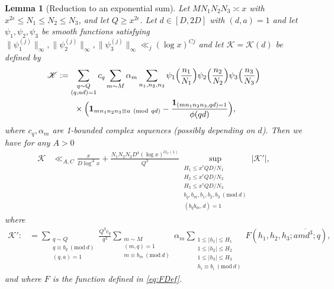 \documentclass[10pt]{amsart}
\theoremstyle{plain}
\newtheorem{lmm}[thrm]{Lemma}
\numberwithin{equation}{section}
\newcommand{\Mod}[1]{\ (\mathrm{mod}\ #1)}
\begin{document}
\begin{lmm}[Reduction to an exponential sum]\label{lmm:K1}
Let $M N_1 N_2 N_3\asymp x$ with $x^{2\epsilon} \le N_1\le N_2\le N_3$, and let $Q\ge x^{2\epsilon}$. Let $d\in[D,2D]$ with $(d,a)=1$ and let $\psi_1,\psi_2,\psi_3$ be smooth functions satisfying $\|\psi_1^{(j)}\|_\infty,\|\psi_2^{(j)}\|_\infty,\|\psi_3^{(j)}\|_\infty\ll_j (\log{x})^{C j}$ and let $\mathscr{K}=\mathscr{K}(d)$ be defined by
\begin{align*}
\mathscr{K}&:=\sum_{\substack{q\sim Q\\ (q,a d)=1}}c_q\sum_{\substack{m\sim M}}\alpha_m\sum_{\substack{n_1,n_2,n_3}}\psi_1\Bigl(\frac{n_1}{N_1}\Bigr)\psi_2\Bigl(\frac{n_2}{N_2}\Bigr)\psi_3\Bigl(\frac{n_3}{N_3}\Bigr)\\
&\qquad \times\Bigl(\mathbf{1}_ {m n_1n_2n_3\equiv a\Mod{q d}}-\frac{\mathbf{1}_{(m n_1 n_2 n_3,q d)=1}}{\phi(q d)}\Bigr),
\end{align*}
where $c_q,\alpha_m$ are 1-bounded complex sequences (possibly depending on $d$). Then we have for any $A>0$
\begin{align*}
\mathscr{K}&\ll_{A,C} \frac{x}{D\log^A{x}}+\frac{N_1 N_2 N_3 D^4(\log{x})^{O_C(1)}}{Q^3}\sup_{\substack{H_1\le x^\epsilon Q D/N_1 \\ H_2\le x^\epsilon Q D/N_2 \\ H_3\le x^\epsilon Q D/N_3\\ b_q,b_m,b_1,b_2,b_3\Mod{d}\\ (b_q b_m,d)=1}} |\mathscr{K}'|,
\end{align*}
where
\begin{align*}
\mathscr{K}':&=\sum_{\substack{q\sim Q\\ q\equiv b_q\Mod{d} \\ (q,a)=1}}\frac{Q^3 c_{q}}{q^3}\sum_{\substack{m\sim M\\ (m,q)=1\\ m\equiv b_m\Mod{d}}}\alpha_m\sum_{\substack{1\le |h_1|\le H_1 \\ 1\le |h_2|\le H_2\\ 1\le |h_3|\le H_3\\ h_i\equiv b_i\Mod{d}}}F(h_1,h_2,h_3;a\overline{md^3};q),
\end{align*}
and where $F$ is the function defined in \eqref{eq:FDef}.
\end{lmm}
%
%
%
%
\end{document}
